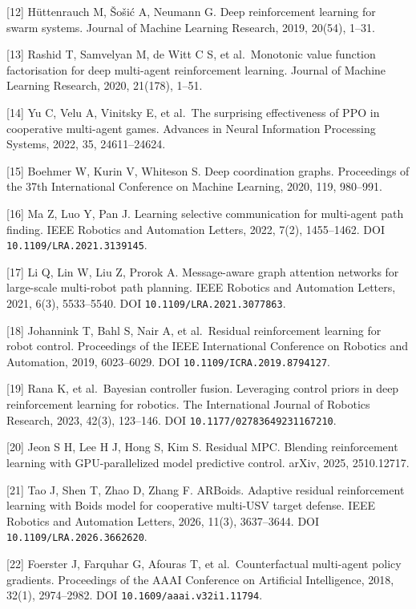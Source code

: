 \documentclass[
  11pt,
  fontset=none]{ctexart}
\begin{document}
{[}12{]} Hüttenrauch M, Šošić A, Neumann G. Deep reinforcement learning
for swarm systems. Journal of Machine Learning Research, 2019, 20(54),
1--31.

{[}13{]} Rashid T, Samvelyan M, de Witt C S, et al.~Monotonic value
function factorisation for deep multi-agent reinforcement learning.
Journal of Machine Learning Research, 2020, 21(178), 1--51.

{[}14{]} Yu C, Velu A, Vinitsky E, et al.~The surprising effectiveness
of PPO in cooperative multi-agent games. Advances in Neural Information
Processing Systems, 2022, 35, 24611--24624.

{[}15{]} Boehmer W, Kurin V, Whiteson S. Deep coordination graphs.
Proceedings of the 37th International Conference on Machine Learning,
2020, 119, 980--991.

{[}16{]} Ma Z, Luo Y, Pan J. Learning selective communication for
multi-agent path finding. IEEE Robotics and Automation Letters, 2022,
7(2), 1455--1462. DOI \nolinkurl{10.1109/LRA.2021.3139145}.

{[}17{]} Li Q, Lin W, Liu Z, Prorok A. Message-aware graph attention
networks for large-scale multi-robot path planning. IEEE Robotics and
Automation Letters, 2021, 6(3), 5533--5540. DOI
\nolinkurl{10.1109/LRA.2021.3077863}.

{[}18{]} Johannink T, Bahl S, Nair A, et al.~Residual reinforcement
learning for robot control. Proceedings of the IEEE International
Conference on Robotics and Automation, 2019, 6023--6029. DOI
\nolinkurl{10.1109/ICRA.2019.8794127}.

{[}19{]} Rana K, et al.~Bayesian controller fusion. Leveraging control
priors in deep reinforcement learning for robotics. The International
Journal of Robotics Research, 2023, 42(3), 123--146. DOI
\nolinkurl{10.1177/02783649231167210}.

{[}20{]} Jeon S H, Lee H J, Hong S, Kim S. Residual MPC. Blending
reinforcement learning with GPU-parallelized model predictive control.
arXiv, 2025, 2510.12717.

{[}21{]} Tao J, Shen T, Zhao D, Zhang F. ARBoids. Adaptive residual
reinforcement learning with Boids model for cooperative multi-USV target
defense. IEEE Robotics and Automation Letters, 2026, 11(3), 3637--3644.
DOI \nolinkurl{10.1109/LRA.2026.3662620}.

{[}22{]} Foerster J, Farquhar G, Afouras T, et al.~Counterfactual
multi-agent policy gradients. Proceedings of the AAAI Conference on
Artificial Intelligence, 2018, 32(1), 2974--2982. DOI
\nolinkurl{10.1609/aaai.v32i1.11794}.
\end{document}
